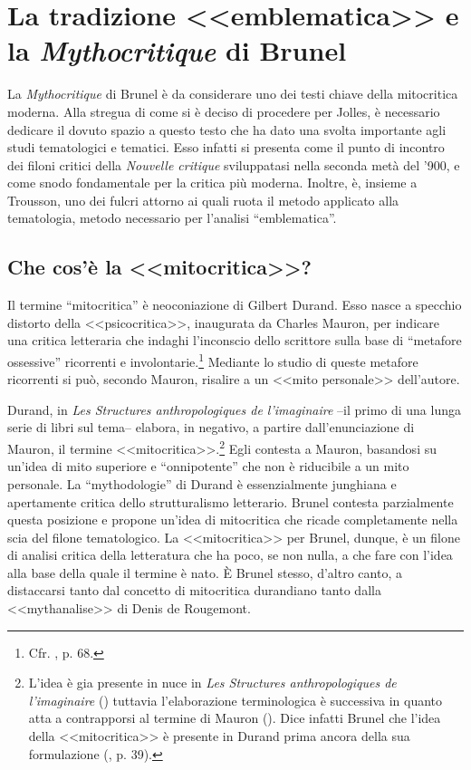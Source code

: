 \documentclass[12pt,a4paper,openright, oneside]{book}
\begin{document}
\section{La tradizione <<emblematica>> e la \textit{Mythocritique} di Brunel}
La \textit{Mythocritique} di Brunel è da considerare uno dei testi chiave della mitocritica moderna. Alla stregua di come si è deciso di procedere per Jolles, è necessario dedicare il dovuto spazio a questo testo che ha dato una svolta importante agli studi tematologici e tematici. Esso infatti si presenta come il punto di incontro dei filoni critici della \textit{Nouvelle critique} sviluppatasi nella seconda metà del '900, e come snodo fondamentale per la critica più moderna. Inoltre, è, insieme a Trousson, uno dei fulcri attorno ai quali ruota il metodo applicato alla tematologia, metodo necessario per l'analisi ``emblematica''.

\subsection{Che cos'è la <<mitocritica>>?}
Il termine ``mitocritica'' è neoconiazione di Gilbert Durand. Esso nasce a specchio distorto della <<psicocritica>>, inaugurata da Charles Mauron, per indicare una critica letteraria che indaghi l'inconscio dello scrittore sulla base di ``metafore ossessive'' ricorrenti e involontarie.\footnote{Cfr. \cite{Mauron}, p. 68.} Mediante lo studio di queste metafore ricorrenti si può, secondo Mauron, risalire a un <<mito personale>> dell'autore.

Durand, in \textit{Les Structures anthropologiques de l'imaginaire} --il primo di una lunga serie di libri sul tema-- elabora, in negativo, a partire dall'enunciazione di Mauron, il termine <<mitocritica>>.\footnote{L'idea è gia presente in nuce in \textit{Les Structures anthropologiques de l'imaginaire} (\cite{Durand}) tuttavia l'elaborazione terminologica è successiva in quanto atta a contrapporsi al termine di Mauron (\cite{Durand1}). Dice infatti Brunel che l'idea della <<mitocritica>> è presente in Durand prima ancora della sua formulazione (\cite{Brunel1}, p. 39).} Egli contesta a Mauron, basandosi su un'idea di mito superiore e ``onnipotente'' che non è riducibile a un mito personale. La ``mythodologie'' di Durand è essenzialmente junghiana e apertamente critica dello strutturalismo letterario. Brunel contesta parzialmente questa posizione e propone un'idea di mitocritica che ricade completamente nella scia del filone tematologico. La <<mitocritica>> per Brunel, dunque, è un filone di analisi critica della letteratura che ha poco, se non nulla, a che fare con l'idea alla base della quale il termine è nato. 
È Brunel stesso, d'altro canto, a distaccarsi tanto dal concetto di mitocritica durandiano tanto dalla <<mythanalise>> di Denis de Rougemont.
\end{document}
